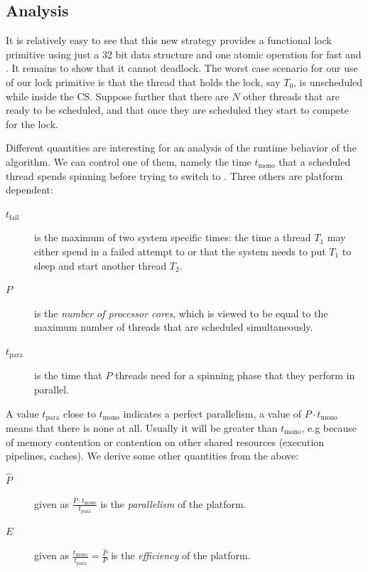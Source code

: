 \subsection{Analysis}
\label{sec-3-2}

It is relatively easy to see that this new strategy provides a
functional lock primitive using just a 32 bit data structure and
one atomic operation for fast  and . It remains to
show that it cannot deadlock.
The worst case scenario for our use of our lock primitive is that
the thread that holds the lock, say $T_0$, is unscheduled while
inside the CS. Suppose further that there are $N$ other threads
that are ready to be scheduled, and that once they are scheduled
they start to compete for the lock.

Different quantities are interesting for an analysis of the runtime
behavior of the algorithm. We can control one of them, namely the
time $t_{\textrm{mono}}$ that a scheduled thread spends spinning
before trying to switch to .  Three others are platform
dependent:
\itemadjust
\begin{description}
\item[{$t_{\textrm{fail}}$}] is the maximum of two system specific
times: the time a thread $T_1$ may either spend in a failed
attempt to  or that the system needs to put $T_1$
to sleep and start another thread $T_2$.\itemadjust

\item[{$P$}] is the \emph{number of processor cores}, which is viewed to be
equal to the maximum number of threads that are scheduled
simultaneously.\itemadjust

\item[{$t_{\textrm{para}}$}] is the time that $P$ threads need for a
spinning phase that they perform in parallel.\itemadjust
\end{description}

A value $t_{\textrm{para}}$ close to $t_{\textrm{mono}}$ indicates
a perfect parallelism, a value of $P \cdot t_{\textrm{mono}}$
means that there is none at all. Usually it will be greater than
$t_{\textrm{mono}}$, e.g because of memory contention or
contention on other shared resources (execution pipelines,
caches). We derive some other quantities from the
above:\itemadjust


\begin{description}
\item[{$\widehat{P}$}] given as $\frac{P\cdot
                       t_{\textrm{mono}}}{t_{\textrm{para}}}$ is the
\emph{parallelism} of the platform.

\item[{$E$}] given as $\frac{t_\textrm{mono}}{t_{\textrm{para}}} =
             \frac{\widehat{P}}{P}$ is the \emph{efficiency} of the
platform.
\end{description}

